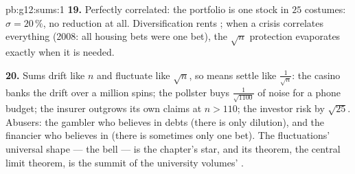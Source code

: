 \begin{solution}{pb:g12:sums:1}
\textbf{19.} Perfectly correlated: the portfolio is one stock
in $25$ costumes: $\sigma = 20\,\%$, no reduction at all.
Diversification rents \emph{}; when a crisis
correlates everything (2008: all housing bets were one bet),
the $\sqrt n$ protection evaporates exactly when it is
needed.

\textbf{20.} Sums drift like $n$ and fluctuate like
$\sqrt n$, so means settle like $\frac{1}{\sqrt n}$: the
casino banks the drift over a million spins; the pollster
buys $\frac{1}{\sqrt{1100}}$ of noise for a phone budget;
the insurer outgrows its own claims at $n > 110$; the
investor  risk by $\sqrt{25}$. Abusers: the gambler
who believes in debts (there is only dilution), and the
financier who believes in  (there is sometimes
only one bet). The fluctuations' universal shape --- the
bell --- is the  chapter's star, and its theorem,
the central limit theorem, is the summit of the university
volumes' .
\end{solution}
